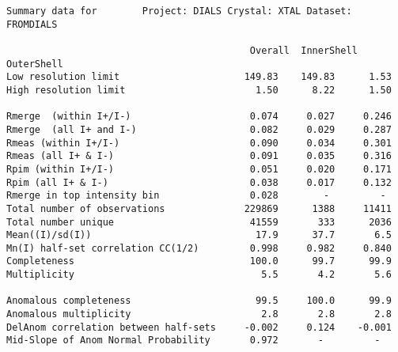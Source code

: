 \documentclass[a4paper, 11pt]{article}
\begin{document}
{\small
\begin{verbatim}
Summary data for        Project: DIALS Crystal: XTAL Dataset: FROMDIALS

                                           Overall  InnerShell  OuterShell
Low resolution limit                      149.83    149.83      1.53
High resolution limit                       1.50      8.22      1.50

Rmerge  (within I+/I-)                     0.074     0.027     0.246
Rmerge  (all I+ and I-)                    0.082     0.029     0.287
Rmeas (within I+/I-)                       0.090     0.034     0.301
Rmeas (all I+ & I-)                        0.091     0.035     0.316
Rpim (within I+/I-)                        0.051     0.020     0.171
Rpim (all I+ & I-)                         0.038     0.017     0.132
Rmerge in top intensity bin                0.028        -         - 
Total number of observations              229869      1388     11411
Total number unique                        41559       333      2036
Mean((I)/sd(I))                             17.9      37.7       6.5
Mn(I) half-set correlation CC(1/2)         0.998     0.982     0.840
Completeness                               100.0      99.7      99.9
Multiplicity                                 5.5       4.2       5.6

Anomalous completeness                      99.5     100.0      99.9
Anomalous multiplicity                       2.8       2.8       2.8
DelAnom correlation between half-sets     -0.002     0.124    -0.001
Mid-Slope of Anom Normal Probability       0.972       -         -  
\end{verbatim}
}
\end{document}
